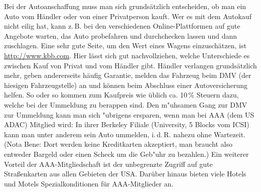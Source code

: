 \documentclass[a4paper]{scrreprt}
\begin{document}
Bei der Autoanschaffung muss man sich grundsätzlich entscheiden, ob man ein Auto vom Händler oder von einer Privatperson kauft. 
Wer es mit dem Autokauf nicht eilig hat, kann z.\,B. bei den verschiedenen Online-Plattformen auf gute Angebote warten, das Auto probefahren und durchchecken lassen und dann zuschlagen. 
Eine sehr gute Seite, um den Wert eines Wagens einzuschätzen, ist \url{http://www.kbb.com}. 
Hier lässt sich gut nachvollziehen, welche Unterschiede es zwischen Kauf von Privat und vom Händler gibt. 
Händler verlangen grundsätzlich mehr, geben andererseits häufig Garantie, melden das Fahrzeug beim DMV (der hiesigen Fahrzeugstelle) an und können beim Abschluss einer Autoversicherung helfen. 
So oder so kommen zum Kaufpreis wie üblich ca. 10\,\% Steuern dazu, welche bei der Ummeldung zu berappen sind.
Den m"uhsamen Gang zur DMV zur Ummeldung kann man sich "ubrigens ersparen, wenn man bei AAA (dem US ADAC) Mitglied wird: In ihrer Berkeley Filiale (University, 5 Blocks vom ICSI) kann man unter anderem sein Auto ummelden, i.\,d.\,R. nahezu ohne Wartezeit.
(Nota Bene: Dort werden keine Kreditkarten akzeptiert, man braucht also entweder Bargeld oder einen Scheck um die Geb"uhr zu bezahlen.) Ein weiterer Vorteil der AAA-Mitgliedschaft ist der unbegrenzte Zugriff auf gute Straßenkarten aus allen Gebieten der USA. Darüber hinaus bieten viele Hotels und Motels Spezialkonditionen für AAA-Mitglieder an.
\end{document}

